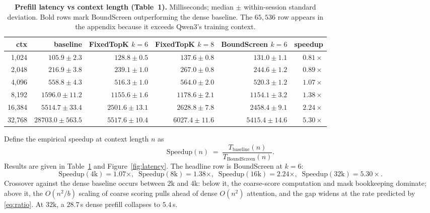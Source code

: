 \documentclass[11pt]{article}
\theoremstyle{plain}
\theoremstyle{definition}
\begin{document}
\begin{table}[t]
\centering
\small
\setlength{\tabcolsep}{5pt}
\begin{tabular}{rrrrrr}
\toprule
\textbf{ctx} & \textbf{baseline} & \textbf{FixedTopK $k{=}6$} & \textbf{FixedTopK $k{=}8$} & \textbf{BoundScreen $k{=}6$} & \textbf{speedup} \\
\midrule
1{,}024  & $105.9 \pm 2.3$    & $128.8 \pm 0.5$   & $137.6 \pm 0.8$   & $131.0 \pm 1.1$   & $0.81\times$ \\
2{,}048  & $216.9 \pm 3.8$    & $239.1 \pm 1.0$   & $267.0 \pm 0.8$   & $244.6 \pm 1.2$   & $0.89\times$ \\
4{,}096  & $558.8 \pm 4.3$    & $516.3 \pm 1.0$   & $564.0 \pm 2.0$   & $520.3 \pm 1.2$   & $\mathbf{1.07\times}$ \\
8{,}192  & $1596.0 \pm 11.2$  & $1155.6 \pm 1.6$  & $1178.6 \pm 2.1$  & $1154.1 \pm 3.2$  & $\mathbf{1.38\times}$ \\
16{,}384 & $5514.7 \pm 33.4$  & $2501.6 \pm 13.1$ & $2628.8 \pm 7.8$  & $2458.4 \pm 9.1$  & $\mathbf{2.24\times}$ \\
32{,}768 & $28703.0 \pm 563.5$ & $5517.6 \pm 10.4$ & $6027.4 \pm 11.6$ & $5415.4 \pm 14.6$ & $\mathbf{5.30\times}$ \\
\bottomrule
\end{tabular}
\caption{\textbf{Prefill latency vs context length (Table~1).} Milliseconds; median $\pm$ within-session standard deviation. Bold rows mark BoundScreen outperforming the dense baseline. The $65{,}536$ row appears in the appendix because it exceeds Qwen3's training context.}
\label{tab:latency}
\end{table}

Define the empirical speedup at context length $n$ as
\begin{equation}
\mathrm{Speedup}(n) \;=\; \frac{T_{\mathrm{baseline}}(n)}{T_{\mathrm{BoundScreen}}(n)}.
\end{equation}
Results are given in Table~\ref{tab:latency} and Figure~\ref{fig:latency}.
The headline row is BoundScreen at $k = 6$:
\[
\mathrm{Speedup}(4\mathrm{k}) = 1.07\times, \;\;
\mathrm{Speedup}(8\mathrm{k}) = 1.38\times, \;\;
\mathrm{Speedup}(16\mathrm{k}) = 2.24\times, \;\;
\mathrm{Speedup}(32\mathrm{k}) = 5.30\times.
\]
Crossover against the dense baseline occurs between $2\mathrm{k}$ and
$4\mathrm{k}$: below it, the coarse-score computation and mask bookkeeping
dominate; above it, the $O(n^2/b)$ scaling of coarse scoring pulls ahead
of dense $O(n^2)$ attention, and the gap widens at the rate predicted by
\eqref{eq:ratio}. At $32\mathrm{k}$, a $28.7$\,s dense prefill collapses
to $5.4$\,s.
\end{document}
